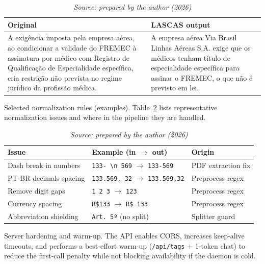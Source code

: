 \documentclass[english]{UNISINOSartigo} %
\newcommand{\floatsource}[1]{\caption*{\footnotesize\textit{Source: #1}}}
\newcommand{\tablesource}[1]{\floatsource{#1}}
\begin{document}
\begin{table}[H]\centering
\caption{Excerpt of the petition and the corresponding LASCAS output (\texttt{medium} level).}
\label{tab:example}
\footnotesize
{}
\setlength{\tabcolsep}{6pt}
\begin{tabularx}{\textwidth}{@{}>{\raggedright\arraybackslash}X >{\raggedright\arraybackslash}X@{}}
\toprule
\textbf{Original} & \textbf{LASCAS output} \\
\midrule
A exigência imposta pela empresa aérea, ao condicionar a validade do FREMEC à assinatura por médico com Registro de Qualificação de Especialidade específica, cria restrição não prevista no regime jurídico da profissão médica. &
A empresa aérea Via Brasil Linhas Aéreas S.A. exige que os médicos tenham título de especialidade específica para assinar o FREMEC, o que não é previsto em lei. \\
\bottomrule
\end{tabularx}
\tablesource{prepared by the author (2026)}
\end{table}

\noindent Selected normalization rules (examples). Table~\ref{tab:normalization-examples} lists representative normalization issues and where in the pipeline they are handled.

\begin{table}[H]\centering
\caption{Examples of normalization and where they are applied.}
\label{tab:normalization-examples}
\begin{tabular}{@{}lll@{}}
\toprule
\textbf{Issue} & \textbf{Example (in $\rightarrow$ out)} & \textbf{Origin} \\
\midrule
Dash break in numbers & \texttt{133- \textbackslash n 569} $\rightarrow$ \texttt{133-569} & PDF extraction fix \\
PT-BR decimals spacing & \texttt{133.569, 32} $\rightarrow$ \texttt{133.569,32} & Preprocess regex \\
Remove digit gaps & \texttt{1 2 3} $\rightarrow$ \texttt{123} & Preprocess regex \\
Currency spacing & \texttt{R\$133} $\rightarrow$ \texttt{R\$ 133} & Preprocess regex \\
Abbreviation shielding & \texttt{Art. 5º} (no split) & Splitter guard \\
\bottomrule
\end{tabular}
\tablesource{prepared by the author (2026)}
\end{table}

\noindent Server hardening and warm-up.
The API enables CORS, increases keep-alive timeouts, and performs a best-effort warm-up (\texttt{/api/tags} + 1-token chat) to reduce the first-call penalty while not blocking availability if the daemon is cold.
\end{document}
